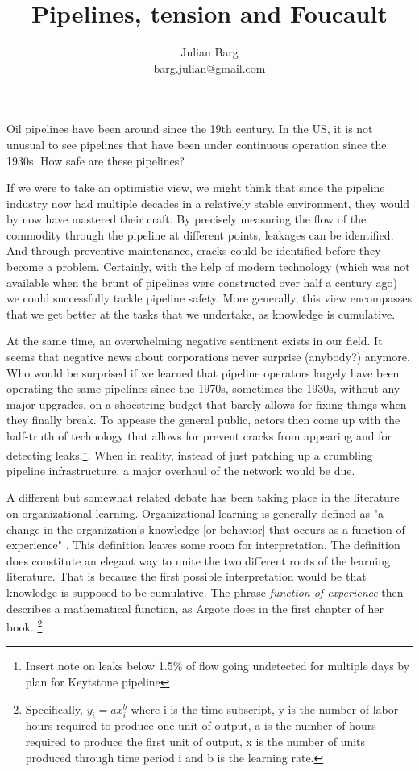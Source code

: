 \documentclass[12pt, man, natbib]{apa6}
\title{Pipelines, tension and Foucault}
\author{Julian Barg\\barg.julian@gmail.com}
\affiliation{Ivey Business School}
\begin{document}
	
	\maketitle
	
	\singlespacing
	
	\section{}	

	Oil pipelines have been around since the 19th century. In the US, it is not unusual to see pipelines that have been under continuous operation since the 1930s. How safe are these pipelines? 
	
	If we were to take an optimistic view, we might think that since the pipeline industry now had multiple decades in a relatively stable environment, they would by now have mastered their craft. By precisely measuring the flow of the commodity through the pipeline at different points, leakages can be identified. And through preventive maintenance, cracks could be identified before they become a problem. Certainly, with the help of modern technology (which was not available when the brunt of pipelines were constructed over half a century ago) we could successfully tackle pipeline safety. More generally, this view encompasses that we get better at the tasks that we undertake, as knowledge is cumulative.
	
	At the same time, an overwhelming negative sentiment exists in our field. It seems that negative news about corporations never surprise (anybody?) anymore. Who would be surprised if we learned that pipeline operators largely have been operating the same pipelines since the 1970s, sometimes the 1930s, without any major upgrades, on a shoestring budget that barely allows for fixing things when they finally break. To appease the general public, actors then come up with the half-truth of technology that allows for prevent cracks from appearing and for detecting leaks.\footnote{Insert note on leaks below 1.5\% of flow going undetected for multiple days by plan for Keytstone pipeline}. When in reality, instead of just patching up a crumbling pipeline infrastructure, a major overhaul of the network would be due.
	
	A different but somewhat related debate has been taking place in the literature on organizational learning. Organizational learning is generally defined as "a change in the organization's knowledge [or behavior] that occurs as a function of experience" \citep[31]{Argote2013b}. This definition leaves some room for interpretation. The definition does constitute an elegant way to unite the two different roots of the learning literature. That is because the first possible interpretation would be that knowledge is supposed to be cumulative. The phrase \textit{function of experience} then describes a mathematical function, as Argote does in the first chapter of her book.
	\footnote{Specifically, $y_i = ax^b_i$ where i is the time subscript, y is the number of labor hours required to produce one unit of output, a is the number of hours required to produce the first unit of output, x is the number of units produced through time period i and b is the learning rate.\citep[11]{Argote2013a}}.
	
\end{document}
